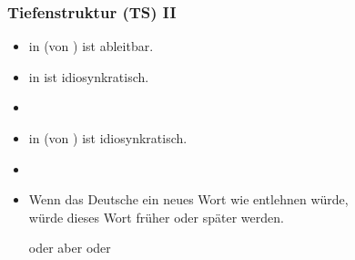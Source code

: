 \begin{frame}
\frametitle{Tiefenstruktur (TS) II}

\begin{itemize}
	\item \textipa{[t]} in  (von ) ist ableitbar.
	\item {} in  ist idiosynkratisch.
	\item[]
	\item {} in  (von ) ist idiosynkratisch.
	\item[]
	\item Wenn das Deutsche ein neues Wort wie  \textipa{[koUd]} entlehnen würde,\\
              würde dieses Wort früher oder später  werden.
	
	\ea \textipa{[kOUt]} oder \textipa{[ko:t]} aber  oder  
	\z
	
\end{itemize}

\end{frame}



